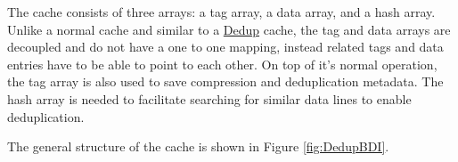 The cache consists of three arrays:
a tag array, a data array, and a hash array. Unlike a normal cache and similar to a \hyperref[sec:Dedup]{Dedup} cache, the tag and data arrays are decoupled and do not have a one to one mapping, instead related tags and data entries have to be able to point to each other. On top of it's normal operation, the tag array is also used to save compression and deduplication metadata. The hash array is needed to facilitate searching for similar data lines to enable deduplication.

The general structure of the cache is shown in Figure \ref{fig:DedupBDI}.
